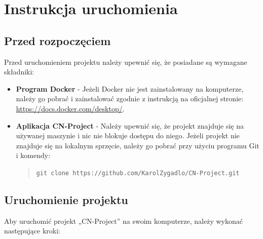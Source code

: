 \chapter{Instrukcja uruchomienia}

\section{Przed rozpoczęciem}
Przed uruchomieniem projektu należy upewnić się, że posiadane są wymagane składniki:

\begin{itemize}
    \item \textbf{Program Docker} - Jeżeli Docker nie jest zainstalowany na komputerze, należy go pobrać i zainstalować zgodnie z instrukcją na oficjalnej stronie: \href{https://docs.docker.com/desktop/}{https://docs.docker.com/desktop/}. 
    \item \textbf{Aplikacja CN-Project} - Należy upewnić się, że projekt znajduje się na używanej maszynie i nic nie blokuje dostępu do niego. Jeżeli projekt nie znajduje się na lokalnym sprzęcie, należy go pobrać przy użyciu programu Git i komendy: 
    \begin{quote} 
        \texttt{git clone https://github.com/KarolZygadlo/CN-Project.git} 
    \end{quote} 
\end{itemize}

\section{Uruchomienie projektu}
Aby uruchomić projekt „CN-Project” na swoim komputerze, należy wykonać następujące kroki:

